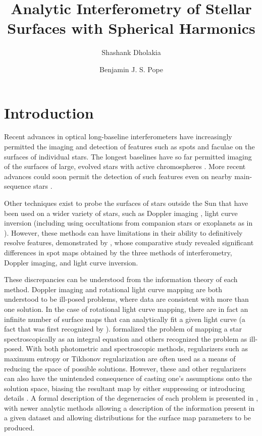 \documentclass[modern]{aastex631}
\begin{document}
\title{Analytic Interferometry of Stellar Surfaces with Spherical Harmonics}

\author{Shashank Dholakia} \author{Benjamin J. S. Pope}

\begin{abstract}
\end{abstract}

\section{Introduction}
\label{sec:intro}
Recent advances in optical long-baseline interferometers have increasingly permitted the imaging and detection of features such as spots and faculae on the surfaces of individual stars. The longest baselines have so far permitted imaging of the surfaces of large, evolved stars with active chromospheres \citep{roettenbacher2016, martinez2021}. More recent advances could soon permit the detection of such features even on nearby main-sequence stars \citep{mourard2018, roettenbacher2022}.

Other techniques exist to probe the surfaces of stars outside the Sun that have been used on a wider variety of stars, such as Doppler imaging \citep{vogt1987}, light curve inversion \citep{harmon2000} (including using occultations from companion stars or exoplanets as in \citet{morris2017}). However, these methods can have limitations in their ability to definitively resolve features, demonstrated by \cite{roettenbacher2017}, whose comparative study revealed significant differences in spot maps obtained by the three methods of interferometry, Doppler imaging, and light curve inversion. 

These discrepancies can be understood from the information theory of each method. Doppler imaging and rotational light curve mapping are both understood to be ill-posed problems, where data are consistent with more than one solution. In the case of rotational light curve mapping, there are in fact an infinite number of surface maps that can analytically fit a given light curve (a fact that was first recognized by \citet{russell1906}). \citet{khoklova1976} formalized the problem of mapping a star spectroscopically as an integral equation and others \citep{goncharskii1977, piskunov1990} recognized the problem as ill-posed. With both photometric and spectroscopic methods, regularizers such as maximum entropy \citep{narayan1986} or Tikhonov regularization \citep{tikhonov1987} are often used as a means of reducing the space of possible solutions. However, these and other regularizers can also have the unintended consequence of casting one's assumptions onto the solution space, biasing the resultant map by either suppressing or introducing details \citep{piskunov1990b}. A formal description of the degeneracies of each problem is presented in \citet{luger2021a, Luger2021b}, with newer analytic methods allowing a description of the information present in a given dataset and allowing distributions for the surface map parameters to be produced. 
\end{document}
